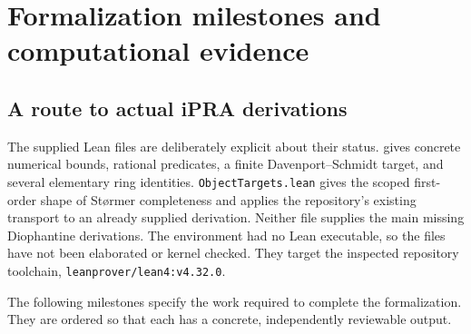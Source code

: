 \section{Formalization milestones and computational evidence}
\label{sec:formalization}

\subsection{A route to actual iPRA derivations}

The supplied Lean files are deliberately explicit about their status.
 gives concrete numerical bounds, rational
predicates, a finite Davenport--Schmidt target, and several elementary ring
identities.  \texttt{ObjectTargets.lean} gives the scoped first-order shape of
St\o rmer completeness and applies the repository's existing transport to an
already supplied derivation.  Neither file supplies the main missing
Diophantine derivations.  The environment had no Lean executable, so the files
have not been elaborated or kernel checked.  They target the inspected
repository toolchain, \texttt{leanprover/lean4:v4.32.0}.

The following milestones specify the work required to complete the
formalization.  They are ordered so that each has a concrete, independently
reviewable output.

